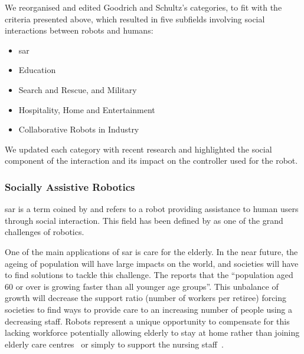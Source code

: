 We reorganised and edited Goodrich and Schultz's categories, to fit with the criteria presented above, which resulted in five subfields involving social interactions between robots and humans: 
\begin{itemize}
	\item \acrfull{sar}
	\item Education
	\item Search and Rescue, and Military
	\item Hospitality, Home and Entertainment
	\item Collaborative Robots in Industry
\end{itemize}
We updated each category with recent research and highlighted the social component of the interaction and its impact on the controller used for the robot.

\subsubsection{Socially Assistive Robotics}

	\gls{sar} is a term coined by \cite{feil2005defining} and refers to a robot providing assistance to human users through social interaction. This field has been defined by \cite{tapus2007socially} as one of the grand challenges of robotics.
	
	One of the main applications of \gls{sar} is care for the elderly. In the near future, the ageing of population will have large impacts on the world, and societies will have to find solutions to tackle this challenge. The \cite{united2017world} reports that the ``population aged 60 or over is growing faster than all younger age groups''. This unbalance of growth will decrease the support ratio (number of workers per retiree) forcing societies to find ways to provide care to an increasing number of people using a decreasing staff. Robots represent a unique opportunity to compensate for this lacking workforce potentially allowing elderly to stay at home rather than joining elderly care centres~\citep{di2014web} or simply to support the nursing staff~\citep{wada2004effects}.
	
	
